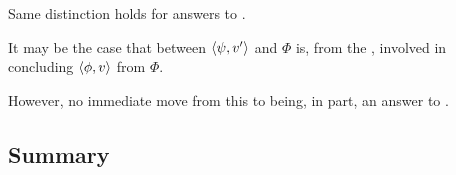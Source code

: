 \begin{note}
  Same distinction holds for answers to \qWhyV{}.

  It may be the case that \support{} between \(\langle \psi, v' \rangle\) and \(\Phi\) is, from the \agpe{}, involved in concluding \(\langle \phi, v \rangle\) from \(\Phi\).

  However, no immediate move from this to \support{} being, in part, an answer to \qWhyV{}.
\end{note}

\subsection{Summary}
\label{cha:var:expand:issue:summary}



